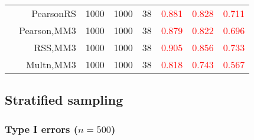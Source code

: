 \documentclass[
]{article}
\begin{document}
\begin{table}[H]
{\begin{tabular}[t]{lrrrrrrr}
\hspace{1em} & PearsonRS & 1000 & 1000 & 38 & \textcolor{red}{0.881} & \textcolor{red}{0.828} & \textcolor{red}{0.711}\\

\hspace{1em} & Pearson,MM3 & 1000 & 1000 & 38 & \textcolor{red}{0.879} & \textcolor{red}{0.822} & \textcolor{red}{0.696}\\

\hspace{1em} & RSS,MM3 & 1000 & 1000 & 38 & \textcolor{red}{0.905} & \textcolor{red}{0.856} & \textcolor{red}{0.733}\\

\hspace{1em} & Multn,MM3 & 1000 & 1000 & 38 & \textcolor{red}{0.818} & \textcolor{red}{0.743} & \textcolor{red}{0.567}\\
\bottomrule
\end{tabular}}
\endgroup{}
\end{table}

\hypertarget{stratified-sampling}{%
\subsection{Stratified sampling}\label{stratified-sampling}}

\hypertarget{type-i-errors-n500-1}{%
\subsubsection{\texorpdfstring{Type I errors
(\(n=500\))}{Type I errors (n=500)}}\label{type-i-errors-n500-1}}
\end{document}
